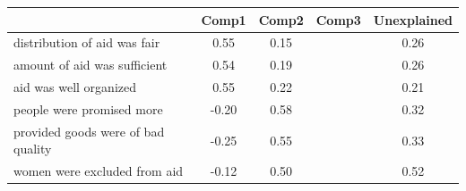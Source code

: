 {
\def\sym#1{\ifmmode^{#1}\else\(^{#1}\)\fi}
\begin{tabular}{l*{1}{cccc}}
\toprule
                    &       Comp1&       Comp2&       Comp3& Unexplained\\
\midrule
distribution of aid was fair&        0.55&        0.15&            &        0.26\\
amount of aid was sufficient&        0.54&        0.19&            &        0.26\\
aid was well organized&        0.55&        0.22&            &        0.21\\
people were promised more&       -0.20&        0.58&            &        0.32\\
provided goods were of bad quality&       -0.25&        0.55&            &        0.33\\
women were excluded from aid&       -0.12&        0.50&            &        0.52\\
\bottomrule
\end{tabular}
}
